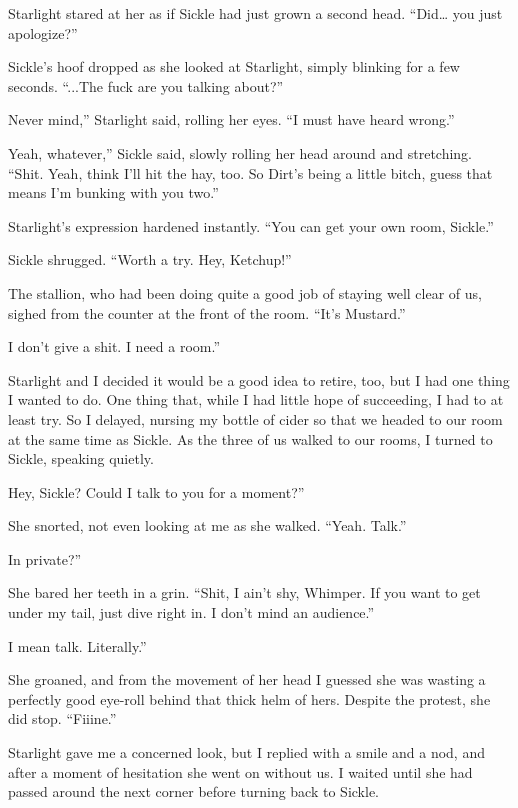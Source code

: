 Starlight stared at her as if Sickle had just grown a second head. “Did… you just apologize?”

Sickle’s hoof dropped as she looked at Starlight, simply blinking for a few seconds. “...The fuck are you talking about?”

\leavevmode{}Never mind,” Starlight said, rolling her eyes. “I must have heard wrong.”

\leavevmode{}Yeah, whatever,” Sickle said, slowly rolling her head around and stretching. “Shit. Yeah, think I’ll hit the hay, too. So Dirt’s being a little bitch, guess that means I’m bunking with you two.”

Starlight’s expression hardened instantly. “You can get your own room, Sickle.”

Sickle shrugged. “Worth a try. Hey, Ketchup!”

The stallion, who had been doing quite a good job of staying well clear of us, sighed from the counter at the front of the room. “It’s Mustard.”

\leavevmode{}I don’t give a shit. I need a room.”

Starlight and I decided it would be a good idea to retire, too, but I had one thing I wanted to do. One thing that, while I had little hope of succeeding, I had to at least try. So I delayed, nursing my bottle of cider so that we headed to our room at the same time as Sickle. As the three of us walked to our rooms, I turned to Sickle, speaking quietly.

\leavevmode{}Hey, Sickle? Could I talk to you for a moment?”

She snorted, not even looking at me as she walked. “Yeah. Talk.”

\leavevmode{}In private?”

She bared her teeth in a grin. “Shit, I ain’t shy, Whimper. If you want to get under my tail, just dive right in. I don’t mind an audience.”

\leavevmode{}I mean talk. Literally.”

She groaned, and from the movement of her head I guessed she was wasting a perfectly good eye-roll behind that thick helm of hers. Despite the protest, she did stop. “Fiiine.”

Starlight gave me a concerned look, but I replied with a smile and a nod, and after a moment of hesitation she went on without us. I waited until she had passed around the next corner before turning back to Sickle.

